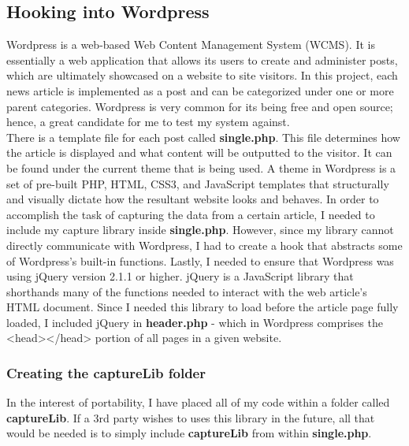 \documentclass[12pt]{article}
\begin{document}
{\subsection{Hooking into Wordpress}
Wordpress is a web-based Web Content Management System (WCMS). It is essentially a web application that allows its users to create and administer posts, which are ultimately showcased on a website to site visitors. In this project, each news article is implemented as a post and can be categorized under one or more parent categories. Wordpress is very common for its being free and open source; hence, a great candidate for me to test my system against. \\
There is a template file for each post called \textbf{single.php}. This file determines how the article is displayed and what content will be outputted to the visitor. It can be found under the current theme that is being used. A theme in Wordpress is a set of pre-built PHP, HTML, CSS3, and JavaScript templates that structurally and visually dictate how the resultant website looks and behaves. In order to accomplish the task of capturing the data from a certain article, I needed to include my capture library inside \textbf{single.php}. However, since my library cannot directly communicate with Wordpress, I had to create a hook that abstracts some of Wordpress's built-in functions. Lastly, I needed to ensure that Wordpress was using jQuery version 2.1.1 or higher. jQuery is a JavaScript library that shorthands many of the functions needed to interact with the web article's HTML document. Since I needed this library to load before the article page fully loaded, I included jQuery in \textbf{header.php} - which in Wordpress comprises the <head></head> portion of all pages in a given website. 

\newpage 

\subsubsection{Creating the captureLib folder} 
In the interest of portability, I have placed all of my code within a folder called \textbf{captureLib}. If a 3rd party wishes to uses this library in the future, all that would be needed is to simply include \textbf{captureLib} from within \textbf{single.php}. \\


}
\end{document}
